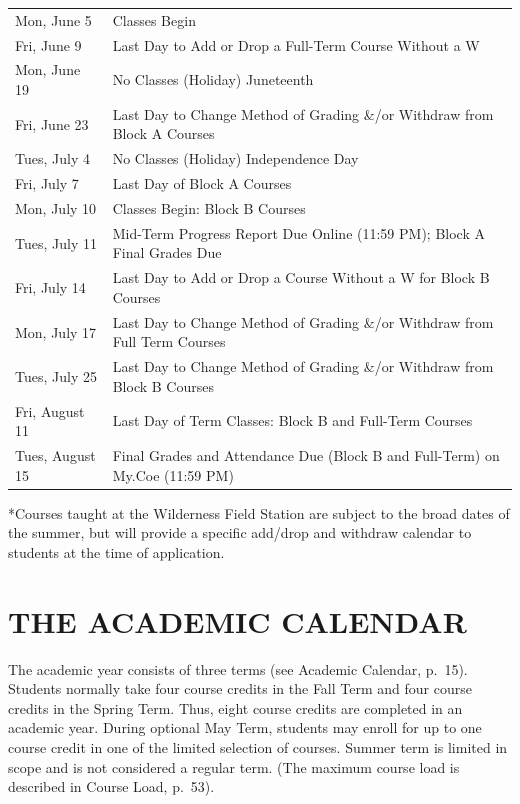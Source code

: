 \documentclass[
  letterpaper,
]{scrbook}
\renewcommand\toprule[2]\relax
\renewcommand\bottomrule[2]\relax
\begin{document}
\begin{longtable}[]{@{}
  >{\raggedright\arraybackslash}p{}
  >{\raggedleft\arraybackslash}p{}@{}}
\toprule\noalign{}
\endhead
\bottomrule\noalign{}
\endlastfoot
Mon, June 5 & Classes Begin \\
Fri, June 9 & Last Day to Add or Drop a Full-Term Course Without a W \\
Mon, June 19 & No Classes (Holiday) Juneteenth \\
Fri, June 23 & Last Day to Change Method of Grading \&/or Withdraw from
Block A Courses \\
Tues, July 4 & No Classes (Holiday) Independence Day \\
Fri, July 7 & Last Day of Block A Courses \\
Mon, July 10 & Classes Begin: Block B Courses \\
Tues, July 11 & Mid-Term Progress Report Due Online (11:59 PM); Block A
Final Grades Due \\
Fri, July 14 & Last Day to Add or Drop a Course Without a W for Block B
Courses \\
Mon, July 17 & Last Day to Change Method of Grading \&/or Withdraw from
Full Term Courses \\
Tues, July 25 & Last Day to Change Method of Grading \&/or Withdraw from
Block B Courses \\
Fri, August 11 & Last Day of Term Classes: Block B and Full-Term
Courses \\
Tues, August 15 & Final Grades and Attendance Due (Block B and
Full-Term) on My.Coe (11:59 PM) \\
\end{longtable}

*Courses taught at the Wilderness Field Station are subject to the broad
dates of the summer, but will provide a specific add/drop and withdraw
calendar to students at the time of application.

\hypertarget{the-academic-calendar}{%
\chapter{THE ACADEMIC CALENDAR}\label{the-academic-calendar}}

The academic year consists of three terms (see Academic Calendar,
p.~15). Students normally take four course credits in the Fall Term and
four course credits in the Spring Term. Thus, eight course credits are
completed in an academic year. During optional May Term, students may
enroll for up to one course credit in one of the limited selection of
courses. Summer term is limited in scope and is not considered a regular
term. (The maximum course load is described in Course Load, p.~53).
\end{document}
